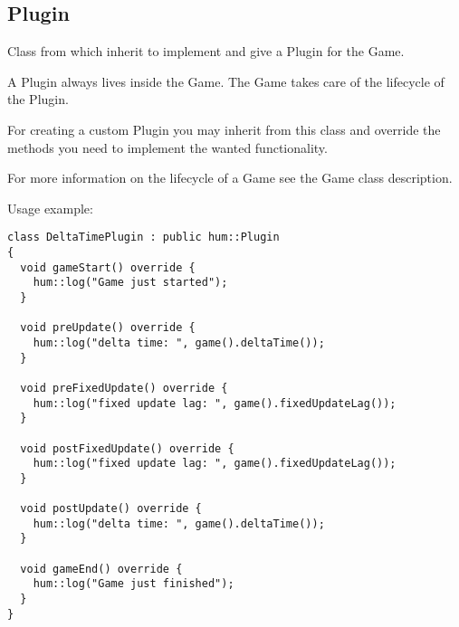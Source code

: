 \subsection{Plugin}
Class from which inherit to implement and give a Plugin for the Game.

A Plugin always lives inside the Game. The Game takes care of the lifecycle
of the Plugin.

For creating a custom Plugin you may inherit from this class and override
the methods you need to implement the wanted functionality.

For more information on the lifecycle of a Game see the Game class description.

Usage example:
\begin{lstlisting}[caption=Plugin example]
class DeltaTimePlugin : public hum::Plugin
{
  void gameStart() override {
    hum::log("Game just started");
  }

  void preUpdate() override {
    hum::log("delta time: ", game().deltaTime());
  }

  void preFixedUpdate() override {
    hum::log("fixed update lag: ", game().fixedUpdateLag());
  }

  void postFixedUpdate() override {
    hum::log("fixed update lag: ", game().fixedUpdateLag());
  }

  void postUpdate() override {
    hum::log("delta time: ", game().deltaTime());
  }

  void gameEnd() override {
    hum::log("Game just finished");
  }
}
\end{lstlisting}
